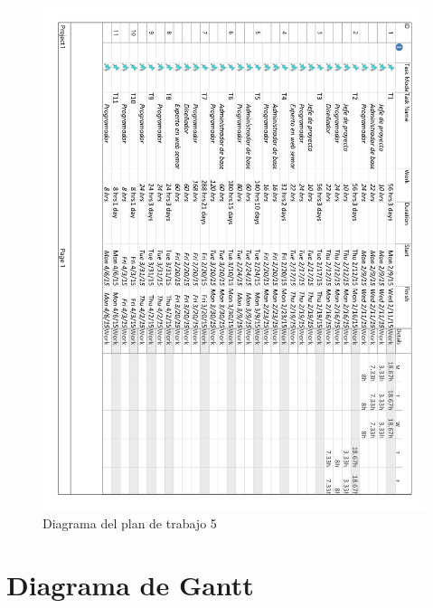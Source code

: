 \begin{figure}[!htp]
	\centering
	\includegraphics[page=5, scale=.8]{fig/work_plan_diagram}
	\caption{Diagrama del plan de trabajo 5}
\end{figure}

\FloatBarrier

\section{Diagrama de Gantt}

